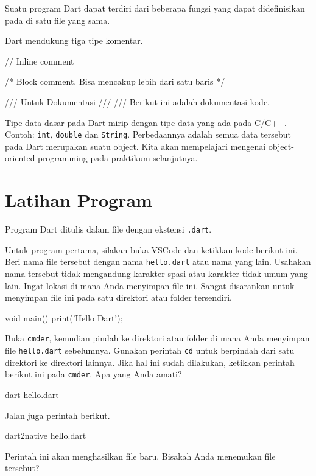 \documentclass[a4paper,11pt]{article} %
\newcommand{\txtinline}[1]{\texttt{#1}}
\newcommand{\dartinline}[1]{\texttt{#1}}
\begin{document}
Suatu program Dart dapat terdiri dari beberapa fungsi yang dapat didefinisikan
pada di satu file yang sama.


Dart mendukung tiga tipe komentar.
\begin{dartcode}
// Inline comment

/*
Block comment.
Bisa mencakup lebih dari satu baris
*/

/// Untuk Dokumentasi
///
/// Berikut ini adalah dokumentasi kode.
\end{dartcode}

Tipe data dasar pada Dart mirip dengan tipe data yang ada pada C/C++.
Contoh: \dartinline{int}, \dartinline{double} dan \dartinline{String}.
Perbedaannya adalah semua data tersebut pada Dart merupakan suatu object.
Kita akan mempelajari mengenai object-oriented programming pada praktikum
selanjutnya.


\section{Latihan Program}

Program Dart ditulis dalam file dengan ekstensi \txtinline{.dart}.

Untuk program pertama, silakan buka VSCode dan ketikkan kode berikut ini.
Beri nama file tersebut dengan nama \txtinline{hello.dart} atau nama yang lain.
Usahakan nama tersebut tidak mengandung karakter spasi atau karakter tidak umum
yang lain. Ingat lokasi di mana Anda menyimpan file ini. Sangat disarankan untuk menyimpan
file ini pada satu direktori atau folder tersendiri.

\begin{dartcode}
void main() {
  print('Hello Dart');
}
\end{dartcode}

Buka \txtinline{cmder}, kemudian pindah ke direktori atau folder di mana Anda
menyimpan file \txtinline{hello.dart} sebelumnya.
Gunakan perintah \txtinline{cd} untuk berpindah dari satu direktori ke
direktori lainnya.
Jika hal ini sudah dilakukan, ketikkan perintah berikut ini pada
\txtinline{cmder}. Apa yang Anda amati?

\begin{textcode}
dart hello.dart
\end{textcode}

Jalan juga perintah berikut.
\begin{textcode}
dart2native hello.dart
\end{textcode}
Perintah ini akan menghasilkan file baru. Bisakah Anda menemukan file tersebut?
\end{document}
